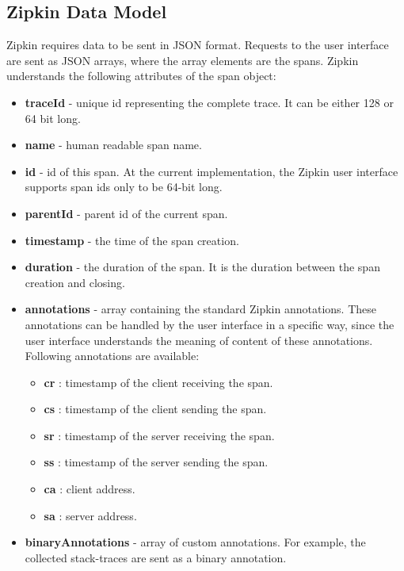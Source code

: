 \subsection{Zipkin Data Model}
Zipkin requires data to be sent in JSON format. Requests to the user interface are sent as JSON arrays, where the array elements are the spans. Zipkin understands the following attributes of the span object:
\begin{itemize}
	\item \textbf{traceId} - unique id representing the complete trace. It can be either 128 or 64 bit long.
	\item \textbf{name} - human readable span name.
	\item \textbf{id} - id of this span. At the current implementation, the Zipkin user interface supports span ids only to be 64-bit long.
	\item \textbf{parentId} - parent id of the current span.
	\item \textbf{timestamp} - the time of the span creation.
	\item \textbf{duration} - the duration of the span. It is the duration between the span creation and closing.
	\item \textbf{annotations} - array containing the standard Zipkin annotations. These annotations can be handled by the user interface in a specific way, since the user interface understands the meaning of content of these annotations. Following annotations are available:
	\begin{itemize}
		\item \textbf{cr} : timestamp of the client receiving the span.
		\item \textbf{cs} : timestamp of the client sending the span.
		\item \textbf{sr} : timestamp of the server receiving the span.
		\item \textbf{ss} : timestamp of the server sending the span.
		\item \textbf{ca} : client address.
		\item \textbf{sa} : server address.
	\end{itemize}
	\item \textbf{binaryAnnotations} - array of custom annotations. For example, the collected stack-traces are sent as a binary annotation.
\end{itemize}

